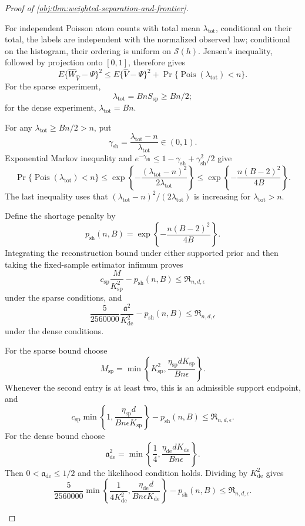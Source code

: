 \documentclass[11pt]{article}
\begin{document}
\begin{proof}[Proof of \cref{obj:thm:weighted-separation-and-frontier}]
\begin{enumerate}
For independent Poisson atom counts with total mean
\(\lambda_{\mathrm{tot}}\), conditional on their total, the labels are independent with the normalized observed law; conditional on the histogram, their ordering is uniform on \(\mathcal S(h)\). Jensen's inequality, followed by projection onto \([0,1]\), therefore gives
\[
E\{\widehat W_{\widehat V}-\Psi\}^2
\le E\{\widehat V-\Psi\}^2
+\Pr\{\operatorname{Pois}(\lambda_{\mathrm{tot}})<n\}.
\]
For the sparse experiment,
\[
\lambda_{\mathrm{tot}}=BnS_{\mathrm{sp}}\ge Bn/2;
\]
for the dense experiment, \(\lambda_{\mathrm{tot}}=Bn\).

For any \(\lambda_{\mathrm{tot}}\ge Bn/2>n\), put
\[
\gamma_{\mathrm{sh}}
=\frac{\lambda_{\mathrm{tot}}-n}{\lambda_{\mathrm{tot}}}\in(0,1).
\]
Exponential Markov inequality and
\(e^{-\gamma_{\mathrm{sh}}}
\le1-\gamma_{\mathrm{sh}}+\gamma_{\mathrm{sh}}^2/2\) give
\[
\Pr\{\operatorname{Pois}(\lambda_{\mathrm{tot}})<n\}
\le
\exp\left\{-\frac{(\lambda_{\mathrm{tot}}-n)^2}
                       {2\lambda_{\mathrm{tot}}}\right\}
\le
\exp\left\{-\frac{n(B-2)^2}{4B}\right\}.
\]
The last inequality uses that
\((\lambda_{\mathrm{tot}}-n)^2/(2\lambda_{\mathrm{tot}})\)
is increasing for \(\lambda_{\mathrm{tot}}>n\).

Define the shortage penalty by
\[
p_{\mathrm{sh}}(n,B)
=\exp\left\{-\frac{n(B-2)^2}{4B}\right\}.
\]
Integrating the reconstruction bound under either supported prior and then taking the fixed-sample estimator infimum proves
\[
c_{\mathrm{sp}}\frac M{K_{\mathrm{sp}}^2}
-p_{\mathrm{sh}}(n,B)
\le\mathfrak R_{n,d,\epsilon}
\]
under the sparse conditions, and
\[
\frac5{2560000}\frac{\mathfrak a^2}{K_{\mathrm{de}}^2}
-p_{\mathrm{sh}}(n,B)
\le\mathfrak R_{n,d,\epsilon}
\]
under the dense conditions.

For the sparse bound choose
\[
M_{\mathrm{sp}}
=\min\left\{
K_{\mathrm{sp}}^2,
\frac{\eta_{\mathrm{sp}}dK_{\mathrm{sp}}}{Bn\epsilon}
\right\}.
\]
Whenever the second entry is at least two, this is an admissible support endpoint, and
\[
c_{\mathrm{sp}}
\min\left\{1,\frac{\eta_{\mathrm{sp}}d}
                    {Bn\epsilon K_{\mathrm{sp}}}\right\}
-p_{\mathrm{sh}}(n,B)
\le\mathfrak R_{n,d,\epsilon}.
\]
For the dense bound choose
\[
\mathfrak a_{\mathrm{de}}^2
=\min\left\{\frac14,
\frac{\eta_{\mathrm{de}}dK_{\mathrm{de}}}{Bn\epsilon}\right\}.
\]
Then \(0<\mathfrak a_{\mathrm{de}}\le1/2\) and the likelihood condition holds. Dividing by \(K_{\mathrm{de}}^2\) gives
\[
\frac5{2560000}
\min\left\{
\frac1{4K_{\mathrm{de}}^2},
\frac{\eta_{\mathrm{de}}d}{Bn\epsilon K_{\mathrm{de}}}
\right\}
-p_{\mathrm{sh}}(n,B)
\le\mathfrak R_{n,d,\epsilon}.
\]


\end{enumerate}
\end{proof}
\end{document}
